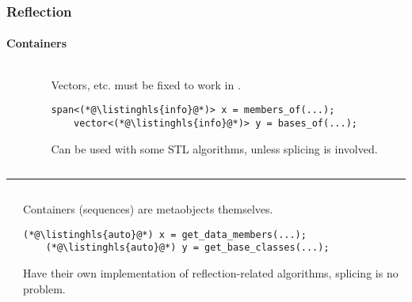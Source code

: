 \documentclass[compress,table,xcolor=table]{beamer}
\begin{document}
\begin{frame}[fragile]
  \frametitle{Reflection}
  \framesubtitle{Containers}
  \begin{columns}
    \begin{column}{.05\textwidth}
    \end{column}
    \begin{column}{.85\textwidth}
    \normalsize
    Vectors, etc. must be fixed to work in .
    \begin{lstlisting}[language=c++2x,basicstyle=\normalsize\ttfamily]
    span<(*@\listinghls{info}@*)> x = members_of(...);
    vector<(*@\listinghls{info}@*)> y = bases_of(...);
    \end{lstlisting}
    Can be used with some STL algorithms, unless splicing is involved.
    \end{column}
  \end{columns}
  \vfill
  \hrule
  \vfill
  \begin{columns}
    \begin{column}{.05\textwidth}
    \end{column}
    \begin{column}{.85\textwidth}
    \normalsize
      Containers (sequences) are metaobjects themselves.
    \begin{lstlisting}[language=c++2x,basicstyle=\normalsize\ttfamily]
    (*@\listinghls{auto}@*) x = get_data_members(...);
    (*@\listinghls{auto}@*) y = get_base_classes(...);
    \end{lstlisting}
    Have their own implementation of reflection-related algorithms, splicing
      is no problem.
    \end{column}
  \end{columns}
\end{frame}
\end{document}
